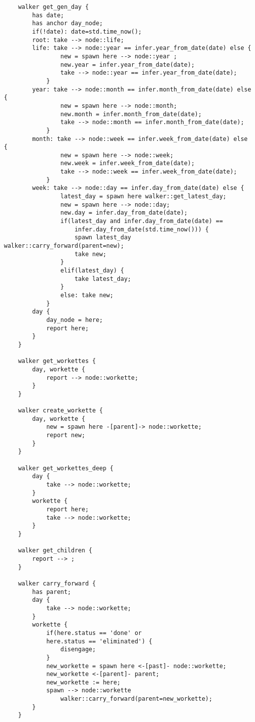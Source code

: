 \begin{lstlisting}
    walker get_gen_day {
        has date;
        has anchor day_node;
        if(!date): date=std.time_now();
        root: take --> node::life;
        life: take --> node::year == infer.year_from_date(date) else {
                new = spawn here --> node::year ;
                new.year = infer.year_from_date(date);
                take --> node::year == infer.year_from_date(date);
            }
        year: take --> node::month == infer.month_from_date(date) else {
                new = spawn here --> node::month;
                new.month = infer.month_from_date(date);
                take --> node::month == infer.month_from_date(date);
            }
        month: take --> node::week == infer.week_from_date(date) else {
                new = spawn here --> node::week;
                new.week = infer.week_from_date(date);
                take --> node::week == infer.week_from_date(date);
            }
        week: take --> node::day == infer.day_from_date(date) else {
                latest_day = spawn here walker::get_latest_day;
                new = spawn here --> node::day;
                new.day = infer.day_from_date(date);
                if(latest_day and infer.day_from_date(date) ==
                    infer.day_from_date(std.time_now())) {
                    spawn latest_day walker::carry_forward(parent=new);
                    take new;
                }
                elif(latest_day) {
                    take latest_day;
                }
                else: take new;
            }
        day {
            day_node = here;
            report here;
        }
    }

    walker get_workettes {
        day, workette {
            report --> node::workette;
        }
    }

    walker create_workette {
        day, workette {
            new = spawn here -[parent]-> node::workette;
            report new;
        }
    }

    walker get_workettes_deep {
        day {
            take --> node::workette;
        }
        workette {
            report here;
            take --> node::workette;
        }
    }

    walker get_children {
        report --> ;
    }

    walker carry_forward {
        has parent;
        day {
            take --> node::workette;
        }
        workette {
            if(here.status == 'done' or
            here.status == 'eliminated') {
                disengage;
            }
            new_workette = spawn here <-[past]- node::workette;
            new_workette <-[parent]- parent;
            new_workette := here;
            spawn --> node::workette
                walker::carry_forward(parent=new_workette);
        }
    }


\end{lstlisting}
